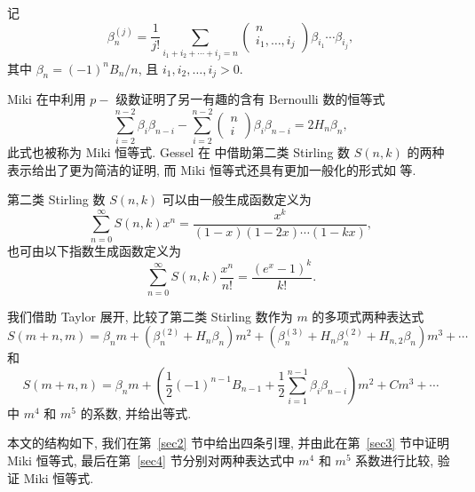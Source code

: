 \documentclass{CombPaper}
\begin{document}
记
\begin{equation}\label{7}
\beta_{n}^{(j)}=\frac{1}{j !} \sum_{i_{1}+i_{2}+\cdots+i_{j}=n}\left(\begin{array}{c}
n \\
i_{1},  \ldots,  i_{j}
\end{array}\right) \beta_{i_{1}} \cdots \beta_{i_{j}}, 
\end{equation}
其中 $\beta_{n} = (-1)^{n} B_{n} / n$,  且 $i_{1},  i_{2},  \ldots,  i_{j}>0$. 


Miki 在\cite{miki1978relation}中利用 $p-$ 级数证明了另一有趣的含有 Bernoulli 数的恒等式
\begin{equation}\label{miki}
\sum_{i=2}^{n-2} \beta_{i} \beta_{n-i}-\sum_{i=2}^{n-2}\left(\begin{array}{l}
n \\
i
\end{array}\right) \beta_{i} \beta_{n-i}=2 H_{n} \beta_{n},
\end{equation}
此式也被称为 Miki 恒等式. Gessel 在 \cite{gessel2005miki} 中借助第二类 Stirling 数 $S(n,  k)$ 的两种表示给出了更为简洁的证明, 而 Miki 恒等式还具有更加一般化的形式如 \cite{dilcher2016general, fu2009symmetric} 等.

第二类 Stirling 数 $S(n,  k)$ 可以由一般生成函数定义为
\begin{equation}\label{stirl_ordgen}
\sum_{n=0}^{\infty} S(n,  k) x^{n}=\frac{x^{k}}{(1-x)(1-2 x) \cdots(1-k x)}, 
\end{equation}
也可由以下指数生成函数定义为
\begin{equation}\label{stirl_gen}
\sum_{n=0}^{\infty} S(n,  k) \frac{x^{n}}{n !}=\frac{\left(e^{x}-1\right)^{k}}{k !}.
\end{equation}

我们借助 Taylor 展开, 比较了第二类 Stirling 数作为 $m$ 的多项式两种表达式
$$
S(m+n,  m)=\beta_{n} m+\left(\beta_{n}^{(2)}+H_{n} \beta_{n}\right) m^{2}+\left(\beta_{n}^{(3)}+H_{n} \beta_{n}^{(2)}+H_{n,  2} \beta_{n}\right) m^{3}+\cdots
$$
和
$$
S(m+n,  n)=\beta_{n} m+\left(\frac{1}{2}(-1)^{n-1} B_{n-1}+\frac{1}{2} \sum_{i=1}^{n-1} \beta_{i} \beta_{n-i}\right) m^{2}+C m^{3}+\cdots
$$
中 $m^4$ 和 $m^5$ 的系数,  并给出等式.

本文的结构如下, 我们在第~\ref{sec2} 节中给出四条引理, 并由此在第~\ref{sec3} 节中证明 Miki 恒等式, 最后在第~\ref{sec4} 节分别对两种表达式中 $m^4$ 和 $m^5$ 系数进行比较, 验证 Miki 恒等式.
\end{document}
